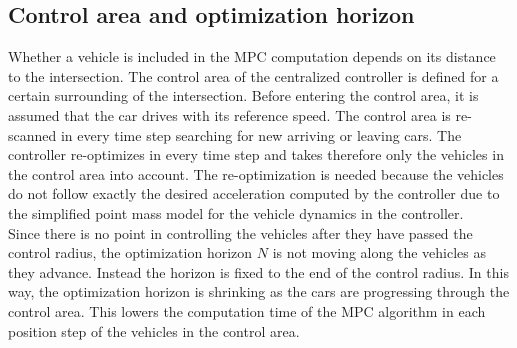 \documentclass[letterpaper,10pt,conference]{ieeeconf}
\begin{document}
\subsection{Control area and optimization horizon}
Whether a vehicle is included in the MPC computation depends on its distance to the intersection. The control area of the centralized controller is defined for a certain surrounding of the intersection. Before entering the control area, it is assumed that the car drives with its reference speed. The control area is re-scanned in every time step searching for new arriving or leaving cars. The controller re-optimizes in every time step and takes therefore only the vehicles in the control area into account. The re-optimization is needed because the vehicles do not follow exactly the desired acceleration computed by the controller due to the simplified point mass model for the vehicle dynamics in the controller.\\ \indent
Since there is no point in controlling the vehicles after they have passed the control radius, the optimization horizon $N$ is not moving along the vehicles as they advance. Instead the horizon is fixed to the end of the control radius. In this way, the optimization horizon is shrinking as the cars are progressing through the control area. This lowers the computation time of the MPC algorithm in each position step of the vehicles in the control area.
\end{document}

